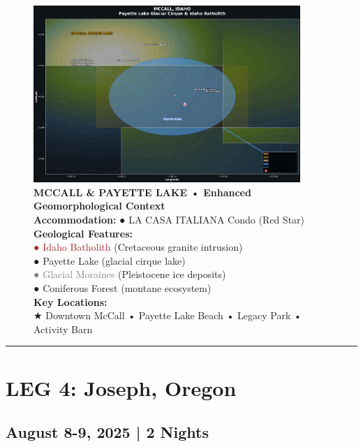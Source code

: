 \documentclass[
  11pt,
]{article}
\begin{document}
\begin{figure}[H]
\centering
\includegraphics[width=0.9\textwidth]{images/mccall_enhanced_geospatial.png}
\caption{\textbf{\textcolor{primary}{MCCALL \& PAYETTE LAKE • Enhanced Geomorphological Context}} \\ 
\textbf{\textcolor{secondary}{Accommodation:}} \textcolor{mapred}{●} LA CASA ITALIANA Condo (Red Star) \\
\textbf{\textcolor{secondary}{Geological Features:}} \\
\textcolor{brown}{●} \textcolor{brown}{Idaho Batholith} (Cretaceous granite intrusion) \\
\textcolor{mapblue}{●} \textcolor{mapblue}{Payette Lake} (glacial cirque lake) \\
\textcolor{gray}{●} \textcolor{gray}{Glacial Moraines} (Pleistocene ice deposits) \\
\textcolor{mapgreen}{●} \textcolor{mapgreen}{Coniferous Forest} (montane ecosystem) \\
\textbf{\textcolor{secondary}{Key Locations:}} \\
\textcolor{mapred}{★} Downtown McCall • Payette Lake Beach • Legacy Park • Activity Barn}
\end{figure}

\begin{center}\rule{0.5\linewidth}{0.5pt}\end{center}

\newpage

\section{\texorpdfstring{\textcolor{primary}{LEG 4: Joseph, Oregon}}{}}\label{section-24}

\subsection{\texorpdfstring{\textcolor{secondary}{August 8-9, 2025 | 2 Nights}}{}}\label{section-25}
\end{document}
